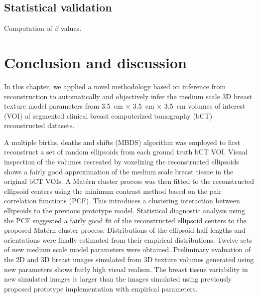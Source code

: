 \documentclass[journal]{IEEEtran}
\begin{document}
\subsection{Statistical validation}
\label{sec:stat-valid}

Computation of $\beta$ values.

\section{Conclusion and discussion}
\label{sec:concl-disc}

In this chapter, we applied a novel methodology based on inference
from reconstruction to automatically and objectively infer the medium
scale 3D breast texture model parameters from \SI{3.5}{\cm} $\times$
\SI{3.5}{\cm} $\times$ \SI{3.5}{\cm} volumes of interest (VOI) of
segmented clinical breast computerized tomography (bCT) reconstructed
datasets.

A multiple births, deaths and shifts (MBDS) algorithm was employed to
first reconstruct a set of random ellipsoids from each ground truth
bCT VOI. Visual inspection of the volumes recreated by voxelizing the
reconstructed ellipsoids shows a fairly good approximation of the
medium scale breast tissue in the original bCT VOIs. A Mat\'{e}rn
cluster process was then fitted to the reconstructed ellipsoid centers
using the minimum contrast method based on the pair correlation
functions (PCF). This introduces a clustering interaction between
ellipsoids to the previous prototype model. Statistical diagnostic
analysis using the PCF suggested a fairly good fit of the
reconstructed ellipsoid centers to the proposed Mat\'{e}rn cluster
process. Distributions of the ellipsoid half lengths and orientations
were finally estimated from their empirical distributions. Twelve sets
of new medium scale model parameters were obtained. Preliminary
evaluation of the 2D and 3D breast images simulated from 3D texture
volumes generated using new parameters shows fairly high visual
realism. The breast tissue variability in new simulated images is
larger than the images simulated using previously proposed prototype
implementation with empirical parameters.
\end{document}
